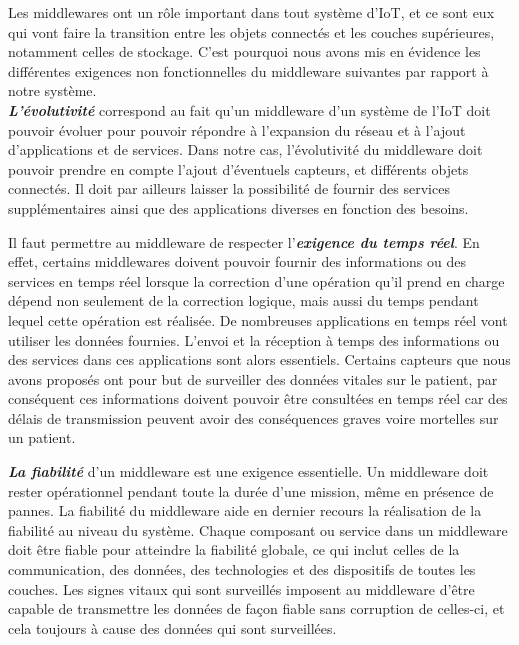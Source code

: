 Les middlewares ont un rôle important dans tout système d’IoT, et ce sont eux qui vont faire la transition entre les objets connectés et les couches supérieures, notamment celles de stockage. C’est pourquoi nous avons mis en évidence les différentes exigences non fonctionnelles du middleware suivantes par rapport à notre système.
\\

\textbf{\textit{L'évolutivité}} correspond au fait qu'un middleware d’un système de l’IoT doit pouvoir évoluer pour pouvoir répondre à l’expansion du réseau et à l’ajout d’applications et de services. Dans notre cas, l’évolutivité du middleware doit pouvoir prendre en compte l’ajout d’éventuels capteurs, et différents objets connectés. Il doit par ailleurs laisser la possibilité de fournir des services supplé\-mentaires ainsi que des applications diverses en fonction des besoins.

Il faut permettre au middleware de respecter l'\textbf{\textit{exigence du temps réel}}. En effet, certains middlewares doivent pouvoir fournir des informations ou des services en temps réel lorsque la correction d'une opération qu’il prend en charge dépend non seulement de la correction logique, mais aussi du temps pendant lequel cette opération est réalisée. De nombreuses applications en temps réel vont utiliser les données fournies. L’envoi et la réception à temps des informations ou des services dans ces applications sont alors essentiels. Certains capteurs que nous avons proposés ont pour but de surveiller des données vitales sur le patient, par conséquent ces informations doivent pouvoir être consultées en temps réel car des délais de transmission peuvent avoir des conséquences graves voire mortelles sur un patient.

\textbf{\textit{La fiabilité}} d'un middleware est une exigence essentielle. Un middleware doit rester opérationnel pendant toute la durée d'une mission, même en présence de pannes. La fiabilité du middleware aide en dernier recours la réalisation de la fiabilité au niveau du système. Chaque composant ou service dans un middleware doit être fiable pour atteindre la fiabilité globale, ce qui inclut celles de la communication, des données, des technologies et des dispositifs de toutes les couches. Les signes vitaux qui sont surveillés imposent au middleware d’être capable de transmettre les données de façon fiable sans corruption de celles-ci, et cela toujours à cause des données qui sont surveillées.

